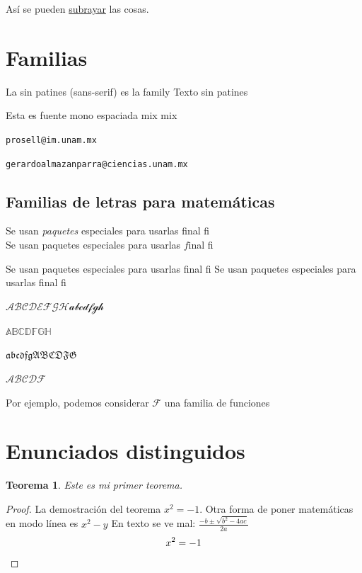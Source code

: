 \documentclass[10pt]{book}
\theoremstyle{definition}
\theoremstyle{plain}
\newtheorem{teo}[defi]{Teorema}
\theoremstyle{remark}
\begin{document}
Así se pueden \ul{subrayar} las cosas. %


\section{Familias}\label{sec:familias}

La \textsf{sin patines} (sans-serif) es la family
{\sffamily Texto sin patines}

{\ttfamily Esta es fuente mono espaciada mix} mix

\texttt{prosell@im.unam.mx}

\texttt{gerardoalmazanparra@ciencias.unam.mx}


\subsection{Familias de letras para matemáticas}

Se usan \emph{paquetes} especiales para usarlas final f{i}\\
Se usan paquetes especiales para usarlas $f$inal f{i} 

\medskip

Se usan paquetes  especiales para usarlas final f{i}
Se usan paquetes especiales para usarlas final f{i}



$\mathcal{ABCDEFGH abcdfgh}$ %

$\mathbb{ABCDFGH}$ %

$\mathfrak{abcdfg ABCDFG}$ %

$\mathscr{ABCDF}$ %

Por ejemplo, podemos considerar $\mathcal{F}$ una familia de funciones

\section{Enunciados distinguidos}

\begin{teo}
    Este es mi primer teorema.
\end{teo}
\begin{proof}
    La demostración del teorema $x^2=-1$. Otra forma de poner matemáticas en modo línea es \(x^2-y\) En texto se ve mal: $\frac{-b\pm\sqrt{b^2-4ac}}{2a}$
    \begin{equation*}
        x^2=-1 \qedhere
    \end{equation*}
\end{proof}
\end{document}
